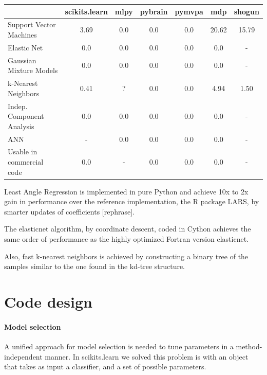 \documentclass[twoside,11pt]{article}
\begin{document}
\begin{center}


\begin{tabular}{l c c c c c c}
\hline\hline %
 & scikits.learn & mlpy & pybrain & pymvpa &  mdp & shogun \\ [0.5ex]
\hline
Support Vector Machines        & 3.69 & 0.0   & 0.0       &  0.0     & 20.62    & 15.79 \\
Elastic Net & 0.0 & 0.0   & 0.0       &  0.0     & 0.0    & - \\
Gaussian Mixture Models  & 0.0 & 0.0   & 0.0       &  0.0     & 0.0    & - \\
k-Nearest Neighbors & 0.41 & ?   & 0.0       &  0.0     & 4.94    & 1.50 \\
Indep. Component Analysis & 0.0 & 0.0  & 0.0  & 0.0  & 0.0  & - \\
ANN  & - & 0.0  & 0.0  & 0.0  & 0.0  & - \\
Usable in commercial code &  0.0 & -   & 0.0       &  0.0     & 0.0    & - \\
\hline
\end{tabular}

\end{center}


Least Angle Regression is implemented in pure Python and achieve 10x
to 2x gain in performance over the reference implementation, the R
package LARS, by smarter updates of coefficients [rephrase].


The elasticnet algorithm, by coordinate descent, coded in Cython
achieves the same order of performance as the highly optimized Fortran
version elasticnet.

Also, fast k-nearest neighbors is achieved by constructing a binary
tree of the samples similar to the one found in the kd-tree structure.


\section{Code design}



\paragraph {Model selection}

A unified approach for model selection is needed to tune parameters in
a method-independent manner. In scikits.learn we solved this problem
is with an object that takes as input a classifier, and a set of
possible parameters.
\end{document}
